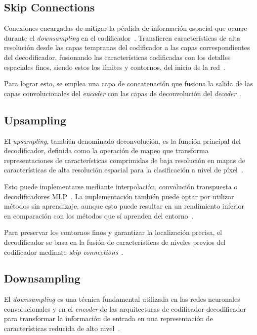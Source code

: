\subsection{Skip Connections}
Conexiones encargadas de mitigar la pérdida de información espacial que ocurre durante el \textit{downsampling} en el codificador~\cite{bala2025visiontranscoder}. Transfieren características de alta resolución desde las capas tempranas del codificador a las capas correspondientes del decodificador, fusionando las características codificadas con los detalles espaciales finos, siendo estos los límites y contornos, del inicio de la red~\cite{badrinarayanan2016segnet, ronneberger2015unet}. 

Para lograr esto, se emplea una capa de concatenación que fusiona la salida de las capas convolucionales del \textit{encoder} con las capas de deconvolución del \textit{decoder}~\cite{ronneberger2015unet, ji2022automation}.

\subsection{Upsampling}
El \textit{upsampling}, también denominado deconvolución, es la función principal del decodificador, definida como la operación de mapeo que transforma representaciones de características comprimidas de baja resolución en mapas de características de alta resolución espacial para la clasificación a nivel de píxel~\cite{badrinarayanan2016segnet, ji2022automation}. 

Esto puede implementarse mediante interpolación, convolución transpuesta o decodificadores MLP~\cite{ji2022automation, cai2023efficientvit}. La implementación también puede optar por utilizar métodos sin aprendizaje, aunque esto puede resultar en un rendimiento inferior en comparación con los métodos que sí aprenden del entorno~\cite{badrinarayanan2016segnet}.

Para preservar los contornos finos y garantizar la localización precisa, el decodificador se basa en la fusión de características de niveles previos del codificador mediante \textit{skip connections}~\cite{ronneberger2015unet, badrinarayanan2016segnet, bala2025visiontranscoder}.

\subsection{Downsampling}
El \textit{downsampling} es una técnica fundamental utilizada en las redes neuronales convolucionales y en el \textit{encoder} de las arquitecturas de codificador-decodificador para transformar la información de entrada en una representación de características reducida de alto nivel~\cite{ji2022automation, badrinarayanan2016segnet}. 

